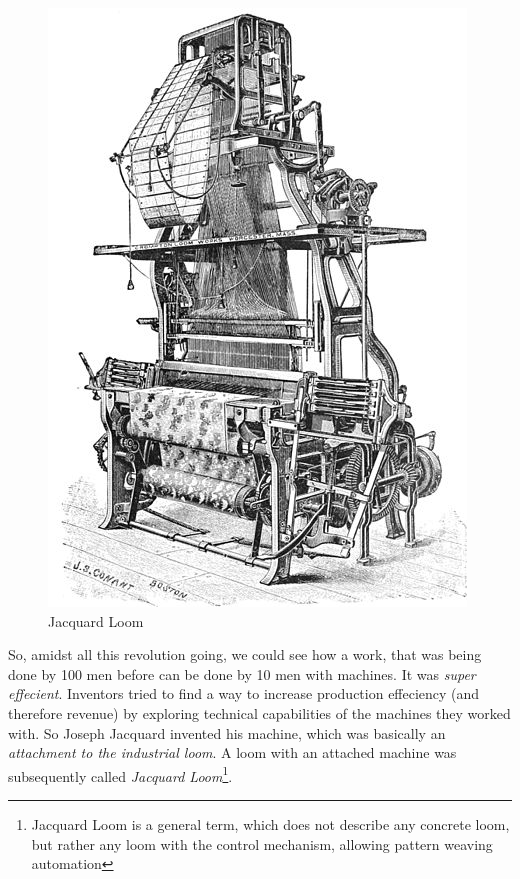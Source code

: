 \documentclass{article}
\begin{document}
            \begin{figure}
                \centering
                \includegraphics[scale=0.2]{images/devices/device_jacquard_loom.jpg}
                \caption{Jacquard Loom}
            \end{figure}

            So, amidst all this revolution going, we could see how a work, that was being done by 100 men before can be done by 10 men with machines. It was \emph{super effecient}.
            Inventors tried to find a way to increase production effeciency (and therefore revenue) by exploring technical capabilities of the machines they worked with. So 
            Joseph Jacquard invented his machine, which was basically an \emph{attachment to the industrial loom}. A loom with an attached machine was subsequently called
            \emph{Jacquard Loom}\footnote{Jacquard Loom is a general term, which does not describe any concrete loom, but rather any loom with the control 
            mechanism, allowing pattern weaving automation}.
\end{document}
